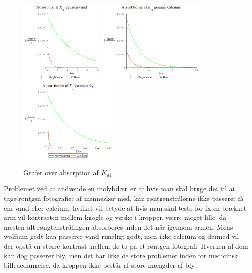 \documentclass[a4paper,twoside]{article}
\begin{document}
\begin{figure}[H]
\begin{centering}
\includegraphics[height=4.15cm]{Absorbtion gennem vand.png}
\hspace{0.5cm}
\includegraphics[height=4.15cm]{Absorbtion gennem calcium.png}
\includegraphics[height=4.15cm]{Absorbtion gennem bly.png}
\par\end{centering}
\caption{\label{cap:2ien} Grafer over absorption af $K_{\alpha1}$ }
\end{figure}
Problemet ved at andvende en molybdæn er at hvis man skal bruge det til at tage røntgen fotografier af mennesker med, kan røntgenstrålerne ikke passerer få cm vand eller calcium, hvilket vil betyde at hvis man skal teste for fx en brækket arm vil kontrasten mellem knogle og væske i kroppen værre meget lille, da næsten alt røngtenstrålingen absorberes inden det når igennem armen. Mens wolfram godt kan passerer vand rimeligt godt, men ikke calcium og dermed vil der opstå en større kontrast mellem de to på et røntgen fotografi. Hverken af dem kan dog passerer bly, men det har ikke de store problemer inden for medicinsk billededannelse, da kroppen ikke består af store mængder af bly. 
\end{document}
